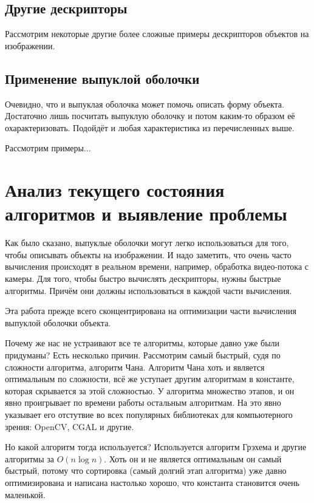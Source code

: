 \subsection{Другие дескрипторы}

Рассмотрим некоторые другие более сложные примеры дескрипторов объектов на изображении.

\subsection{Применение выпуклой оболочки}

Очевидно, что и выпуклая оболочка может помочь описать форму объекта. Достаточно лишь посчитать выпуклую оболочку и потом каким-то образом её охарактеризовать. Подойдёт и любая характеристика из перечисленных выше.

Рассмотрим примеры... %

\section{Анализ текущего состояния алгоритмов и выявление проблемы} \label{sect1_2}

Как было сказано, выпуклые оболочки могут легко использоваться для того, чтобы описывать объекты на изображении. И надо заметить, что очень часто вычисления происходят в реальном времени, например, обработка видео-потока с камеры. Для того, чтобы быстро вычислять дескрипторы, нужны быстрые алгоритмы. Причём они должны использоваться в каждой части вычисления.

Эта работа прежде всего сконцентрирована на оптимизации части вычисления выпуклой оболочки объекта.

Почему же нас не устраивают все те алгоритмы, которые давно уже были придуманы? Есть несколько причин. Рассмотрим самый быстрый, судя по сложности алгоритма, алгоритм Чана. Алгоритм Чана хоть и является оптимальным по сложности, всё же уступает другим алгоритмам в константе, которая скрывается за этой сложностью. У алгоритма множество этапов, и он явно проигрывает по времени работы остальным алгоритмам. На это явно указывает его отстутвие во всех популярных библиотеках для компьютерного зрения: OpenCV\cite{opencvconvexhull}, CGAL\cite{cgalconvexhull} и другие.

Но какой алгоритм тогда используется? Используется алгоритм Грэхема и другие алгоритмы за $O(n \log n)$. Хоть он и не является оптимальным он самый быстрый, потому что сортировка (самый долгий этап алгоритма) уже давно оптимизирована и написана настолько хорошо, что константа становится очень маленькой.

